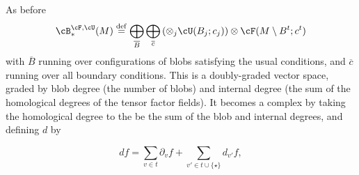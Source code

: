 As before
\begin{equation*}
	\cB_*^{\cF,\cU}(M) \deq \bigoplus_{\overline{B}} \bigoplus_{\overline{c}}
		\left( \otimes_j \cU(B_j; c_j)\right) \otimes \cF(M \setmin B^t; c^t)
\end{equation*}
with $\overline{B}$ running over configurations of blobs satisfying the usual conditions, and $\overline{c}$ running over all boundary conditions. This is a doubly-graded vector space, graded by blob degree (the number of blobs) and internal degree (the sum of the homological degrees of the tensor factor fields). It becomes a complex by taking the homological degree to the be the sum of the blob and internal degrees, and defining $d$ by

\begin{equation*}
d f = \sum_{v \in t} \partial_v f + \sum_{v' \in t \cup \{\star\}} d_{v'} f,
\end{equation*}




